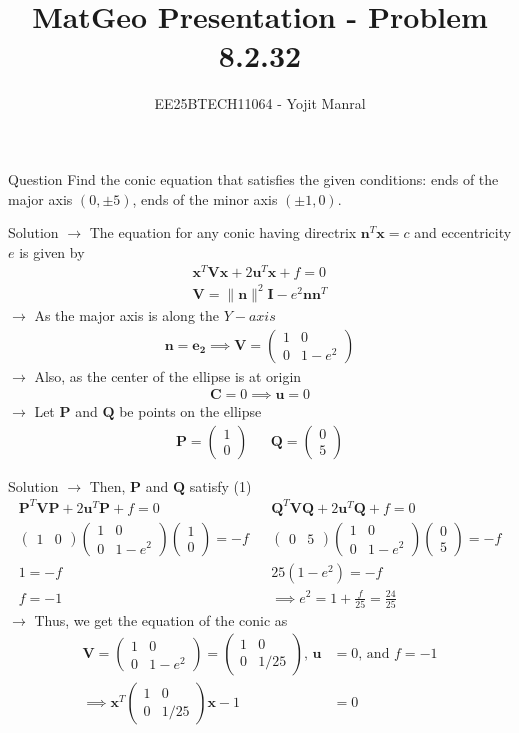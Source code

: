 \documentclass{beamer}
\title{MatGeo Presentation - Problem 8.2.32}
\author{EE25BTECH11064 - Yojit Manral}
\date{}
\numberwithin{equation}{section}
\theoremstyle{remark}
\providecommand{\norm}[1]{\lVert#1\rVert}
\newcommand{\myvec}[1]{\ensuremath{\begin{pmatrix}#1\end{pmatrix}}}
\let\vec\mathbf
\begin{document}
\frame{\titlepage}
\begin{frame}{Question}
Find the conic equation that satisfies the given conditions: ends of the major axis $(0,\pm5)$, ends of the minor axis $(\pm1,0)$.
\end{frame}

\begin{frame}{Solution}
$\rightarrow$ The equation for any conic having directrix $\vec{n}^T\vec{x}=c$ and eccentricity $e$ is given by
\begin{align}
    \vec{x}^T\vec{V}\vec{x} + 2\vec{u}^T\vec{x} + f = 0 \\
    \vec{V} = \norm{\vec{n}}^2\vec{I}-e^2\vec{n}\vec{n}^T
\end{align}
$\rightarrow$ As the major axis is along the $Y-axis$
\begin{align} \vec{n} = \vec{e_2} \implies \vec{V} = \myvec{1&0\\0&1-e^2} \end{align}
$\rightarrow$ Also, as the center of the ellipse is at origin
\begin{align} \vec{C} = 0 \implies \vec{u} = 0 \end{align}
$\rightarrow$ Let $\vec{P}$ and $\vec{Q}$ be points on the ellipse
\begin{align} \vec{P} = \myvec{1\\0} && \vec{Q} = \myvec{0\\5} \end{align}
\end{frame}

\begin{frame}{Solution}
$\rightarrow$ Then, $\vec{P}$ and $\vec{Q}$ satisfy (1)
\begin{align}
    \vec{P}^T\vec{V}\vec{P} + 2\vec{u}^T\vec{P} + f = 0 && \vec{Q}^T\vec{V}\vec{Q} + 2\vec{u}^T\vec{Q} + f = 0 \\
    \myvec{1&0}\myvec{1&0\\0&1-e^2}\myvec{1\\0} = -f && \myvec{0&5}\myvec{1&0\\0&1-e^2}\myvec{0\\5} = -f \\
    1 = -f && 25(1-e^2) = -f\\
    f = -1 && \implies e^2 = 1+\frac{f}{25} = \frac{24}{25}
\end{align}
$\rightarrow$ Thus, we get the equation of the conic as
\begin{align}
    \vec{V}=\myvec{1&0\\0&1-e^2}=\myvec{1&0\\0&1/25} \text{, } \vec{u}&=0 \text{, and } f=-1\\
    \implies \vec{x}^T\myvec{1&0\\0&1/25}\vec{x} - 1 &= 0
\end{align}
\end{frame}
\end{document}
